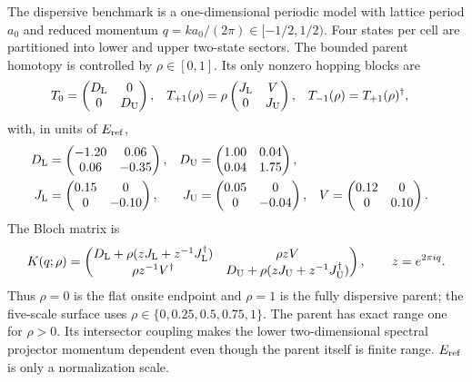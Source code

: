 \documentclass[11pt]{article}
\theoremstyle{definition}
\begin{document}
The dispersive benchmark is a one-dimensional periodic model with lattice period $a_0$
and reduced momentum $q=ka_0/(2\pi)\in[-1/2,1/2)$.  Four states per cell are partitioned
into lower and upper two-state sectors.  The bounded parent homotopy is controlled by $\rho\in[0,1]$.  Its only nonzero
hopping blocks are
\begin{align}
 T_0&=\begin{pmatrix}D_{\rm L}&0\\0&D_{\rm U}\end{pmatrix},&
 T_{+1}(\rho)&=\rho\begin{pmatrix}J_{\rm L}&V\\0&J_{\rm U}\end{pmatrix},&
 T_{-1}(\rho)&=T_{+1}(\rho)^\dagger,
 \label{eq:rank2-parent-blocks}
\end{align}
with, in units of $E_{\rm ref}$,
\begin{align}
 D_{\rm L}&=\begin{pmatrix}-1.20&0.06\\0.06&-0.35\end{pmatrix},&
 D_{\rm U}&=\begin{pmatrix}1.00&0.04\\0.04&1.75\end{pmatrix},\nonumber\\
 J_{\rm L}&=\begin{pmatrix}0.15&0\\0&-0.10\end{pmatrix},&
 J_{\rm U}&=\begin{pmatrix}0.05&0\\0&-0.04\end{pmatrix},&
 V&=\begin{pmatrix}0.12&0\\0&0.10\end{pmatrix}.
 \label{eq:rank2-parent-values}
\end{align}
The Bloch matrix is
\begin{equation}
 K(q;\rho)=\begin{pmatrix}
 D_{\rm L}+\rho(zJ_{\rm L}+z^{-1}J_{\rm L}^\dagger)&\rho zV\\
 \rho z^{-1}V^\dagger&D_{\rm U}+\rho(zJ_{\rm U}+z^{-1}J_{\rm U}^\dagger)
 \end{pmatrix},\qquad z=e^{2\pi iq}.
 \label{eq:rank2-parent-bloch}
\end{equation}
Thus $\rho=0$ is the flat onsite endpoint and $\rho=1$ is the fully dispersive parent;
the five-scale surface uses $\rho\in\{0,0.25,0.5,0.75,1\}$.  The parent has exact range
one for $\rho>0$.  Its intersector coupling makes the lower two-dimensional
spectral projector momentum dependent even though the parent itself is finite range.
$E_{\rm ref}$ is only a normalization scale.
\end{document}
